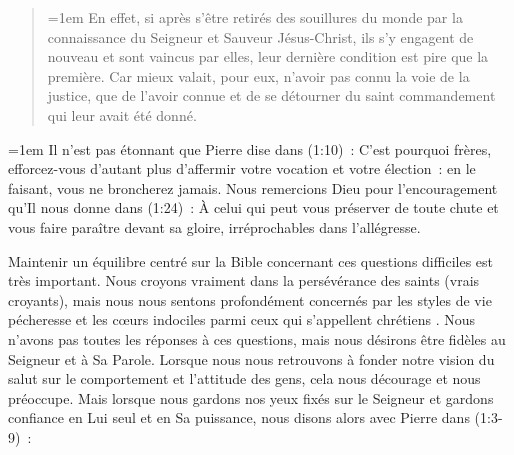 \pocketpagebreak

\begin{quote}
\begin{pocketpar}{\emergencystretch=1em}
 \og En effet, si après s'être retirés
 des souil\-lures du monde par la connaissance du Seigneur et Sauveur Jésus-Christ,
 ils s'y engagent de nouveau et sont vaincus par elles, leur dernière condition
 est pire que la première.
 Car mieux valait, pour eux, n'avoir pas connu la voie de la justice,
 que de l'avoir connue et de se détourner du saint commandement
 qui leur avait été donné. \fg{}
\end{pocketpar}
\end{quote}

\begin{digestpar}{\BRallowhypbch}
\begin{pocketpar}{\emergencystretch=1em}
Il n'est pas étonnant que Pierre dise dans (1:10)~:
 \og C'est pourquoi frères, efforcez-vous d'autant plus d'affermir
 votre vocation et votre élection~: en le faisant, vous ne broncherez jamais. \fg{}
Nous remercions Dieu pour l'encouragement qu'Il nous donne dans (1:24)~:
 \og À celui qui peut vous préserver de toute chute et vous faire paraître
 devant sa gloire, irréprochables dans l'allégresse. \fg{}
\end{pocketpar}
\end{digestpar}

\begin{pocketpar}{}
Maintenir un équilibre centré sur la Bible concernant ces questions difficiles est très important.
 Nous croyons vraiment dans la persévérance des saints (vrais croyants),
 mais nous nous sentons profondément concernés par les styles de vie pécheresse
 et les cœurs indociles parmi ceux qui s'appellent \og chrétiens \fg{}.
 Nous n'avons pas toutes les réponses à ces questions,
 mais nous désirons être fidèles au Seigneur et à Sa Parole.
 Lorsque nous nous retrouvons à fonder notre vision du salut
 sur le comportement et l'attitude des gens, cela nous
 décourage et nous préoccupe.
 Mais lorsque nous gardons nos yeux fixés sur le Seigneur et gardons confiance en Lui seul
 et en Sa puissance, nous disons alors avec Pierre dans
 (1:3-9)~:
\end{pocketpar}

